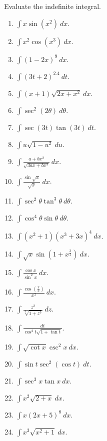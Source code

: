 \begin{problem}
Evaluate the indefinite integral.
\begin{multicols}{2}
\begin{enumerate}
\item $\displaystyle\int x \sin(x^2)~dx $.
\item $\displaystyle\int x^2\cos(x^3)~dx $.
\item $\displaystyle\int (1-2x)^9 ~dx $.
\item $\displaystyle\int (3t+2)^{2.4}~dt $.
\item $\displaystyle\int (x+1)\sqrt{2x+x^2} ~dx $.
\item $\displaystyle\int \sec^2(2\theta) ~d\theta $.
\item $\displaystyle\int \sec (3t) \tan (3t)~dt $.
\item $\displaystyle\int u\sqrt{1-u^2} ~du $.
\item $\displaystyle\int \frac{a+bx^2}{\sqrt{3ax+bx^3}}~dx $.
\item $\displaystyle\int \frac{\sin \sqrt{x}}{\sqrt{x}} ~dx $.
\item $\displaystyle\int \sec^2\theta \tan^3\theta  ~d\theta $.
\item $\displaystyle\int \cos^4\theta\sin \theta ~d\theta $.
\item $\displaystyle\int (x^2+1)(x^3+3x)^4 ~dx $.
\item $\displaystyle\int \sqrt{x}\sin (1+x^{\frac{3}{2}}) ~dx $.
\item $\displaystyle\int \frac{\cos x}{\sin^2 x} ~dx $.
\item $\displaystyle\int \frac{\cos\left(\frac{\pi}{x}\right)}{x^2} ~dx $.
\item $\displaystyle\int \frac{z^2}{\sqrt[3]{1+z^3}} ~dz $.
\item $\displaystyle\int \frac{dt}{\cos^2 t\sqrt{1+\tan t}} $.
\item $\displaystyle\int \sqrt{\cot x} \csc^2 x~dx $.
\item $\displaystyle\int \sin t \sec^2(\cos t)~dt $.
\item $\displaystyle\int \sec^3x \tan x~dx $.
\item $\displaystyle\int x^2\sqrt{2+x}~dx $.
\item $\displaystyle\int x(2x+5)^8 ~dx $.
\item $\displaystyle\int x^3\sqrt{x^2+1} ~dx $.
\end{enumerate}
\end{multicols}
\end{problem}
